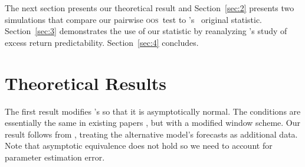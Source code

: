 \documentclass[12pt]{article}
\newcommand\citepos[2][]{\citeauthor{#2}'s \citeyearpar[#1]{#2}}
\newcommand\poscw{\citeauthor{ClW:06}'s \citeyearpar{ClW:06,ClW:07}}
\theoremstyle{definition}
\newcommand{\oos}{\textsc{oos}}
\begin{document}
The next section presents our theoretical result and
Section~\ref{sec:2} presents two simulations that compare our pairwise
\oos\ test to \poscw\ original statistic.  Section~\ref{sec:3}
demonstrates the use of our statistic by reanalyzing \citepos{GoW:08}
study of excess return predictability. Section~\ref{sec:4} concludes.

\section{Theoretical Results}\label{sec:1}
The first result modifies \citepos{ClW:07} so that it is
asymptotically normal. The conditions are essentially the same in
existing papers
\citep[e.g.][]{ClW:07,ClW:06,Wes:96,WeM:98,Mcc:00,GiW:06}, but with a
modified window scheme.  Our result follows from \citet{Wes:96},
treating the alternative model's forecasts as additional data. Note
that asymptotic equivalence does not hold so we need to account for
parameter estimation error.
\end{document}
